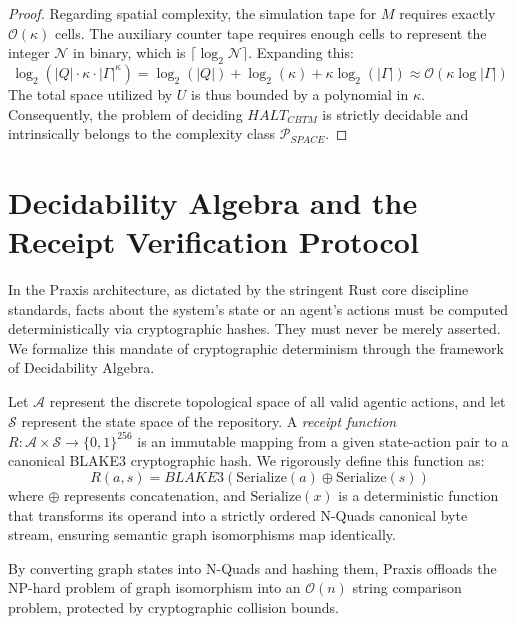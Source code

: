 \begin{proof}
Regarding spatial complexity, the simulation tape for $M$ requires exactly $\mathcal{O}(\kappa)$ cells. The auxiliary counter tape requires enough cells to represent the integer $\mathcal{N}$ in binary, which is $\lceil \log_2 \mathcal{N} \rceil$. Expanding this:
\begin{equation}
\log_2(|Q| \cdot \kappa \cdot |\Gamma|^\kappa) = \log_2(|Q|) + \log_2(\kappa) + \kappa \log_2(|\Gamma|) \approx \mathcal{O}(\kappa \log |\Gamma|)
\end{equation}
The total space utilized by $U$ is thus bounded by a polynomial in $\kappa$. Consequently, the problem of deciding $HALT_{CBTM}$ is strictly decidable and intrinsically belongs to the complexity class $\mathcal{P}_{SPACE}$.
\end{proof}

\section{Decidability Algebra and the Receipt Verification Protocol}

In the Praxis architecture, as dictated by the stringent Rust core discipline standards, facts about the system's state or an agent's actions must be computed deterministically via cryptographic hashes. They must never be merely asserted. We formalize this mandate of cryptographic determinism through the framework of Decidability Algebra.

\begin{definition}
\label{def:receipt_function}
Let $\mathcal{A}$ represent the discrete topological space of all valid agentic actions, and let $\mathcal{S}$ represent the state space of the repository. A \textit{receipt function} $R: \mathcal{A} \times \mathcal{S} \rightarrow \{0, 1\}^{256}$ is an immutable mapping from a given state-action pair to a canonical BLAKE3 cryptographic hash. We rigorously define this function as:
\begin{equation}
R(a, s) = BLAKE3(\text{Serialize}(a) \oplus \text{Serialize}(s))
\end{equation}
where $\oplus$ represents concatenation, and $\text{Serialize}(x)$ is a deterministic function that transforms its operand into a strictly ordered N-Quads canonical byte stream, ensuring semantic graph isomorphisms map identically.
\end{definition}

By converting graph states into N-Quads and hashing them, Praxis offloads the NP-hard problem of graph isomorphism into an $\mathcal{O}(n)$ string comparison problem, protected by cryptographic collision bounds.

